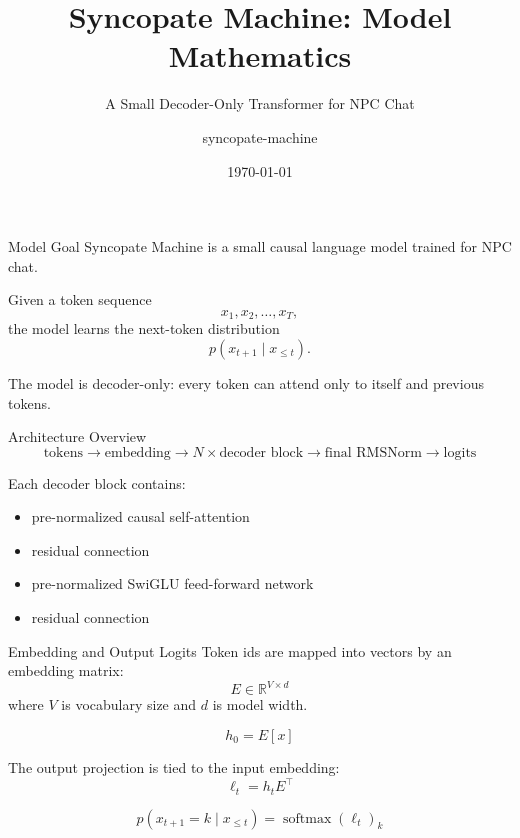 \documentclass[aspectratio=169]{beamer}
\title{Syncopate Machine: Model Mathematics}
\subtitle{A Small Decoder-Only Transformer for NPC Chat}
\author{syncopate-machine}
\date{\today}
\newcommand{\R}{\mathbb{R}}
\newcommand{\softmax}{\operatorname{softmax}}
\begin{document}
\begin{frame}
  \titlepage
\end{frame}

\begin{frame}{Model Goal}
  Syncopate Machine is a small causal language model trained for NPC chat.

  \vspace{0.5em}

  Given a token sequence
  \[
    x_1, x_2, \ldots, x_T,
  \]
  the model learns the next-token distribution
  \[
    p(x_{t+1} \mid x_{\le t}).
  \]

  \vspace{0.5em}

  The model is decoder-only: every token can attend only to itself and previous tokens.
\end{frame}

\begin{frame}{Architecture Overview}
  \[
    \text{tokens}
    \rightarrow
    \text{embedding}
    \rightarrow
    N \times \text{decoder block}
    \rightarrow
    \text{final RMSNorm}
    \rightarrow
    \text{logits}
  \]

  \vspace{0.5em}

  Each decoder block contains:

  \begin{itemize}
    \item pre-normalized causal self-attention
    \item residual connection
    \item pre-normalized SwiGLU feed-forward network
    \item residual connection
  \end{itemize}
\end{frame}

\begin{frame}{Embedding and Output Logits}
  Token ids are mapped into vectors by an embedding matrix:
  \[
    E \in \R^{V \times d}
  \]
  where \(V\) is vocabulary size and \(d\) is model width.

  \[
    h_0 = E[x]
  \]

  \vspace{0.5em}

  The output projection is tied to the input embedding:
  \[
    \ell_t = h_t E^\top
  \]

  \[
    p(x_{t+1} = k \mid x_{\le t})
    =
    \softmax(\ell_t)_k
  \]
\end{frame}
\end{document}
